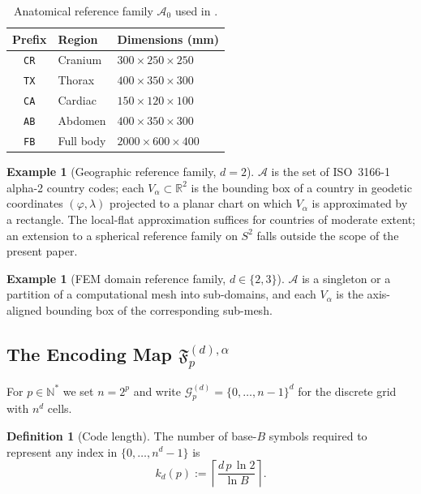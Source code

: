 \documentclass[11pt,a4paper]{article}
\theoremstyle{plain}
\theoremstyle{definition}
\newtheorem{definition}[theorem]{Definition}
\newtheorem{example}[theorem]{Example}
\theoremstyle{remark}
\newcommand{\N}{\mathbb{N}}
\newcommand{\R}{\mathbb{R}}
\newcommand{\Fc}{\mathfrak{F}}
\newcommand{\Grid}{\mathcal{G}}
\begin{document}
\begin{table}[!htbp]
\centering
\small
\begin{tabular}{cll}
\toprule
Prefix & Region & Dimensions (mm) \\
\midrule
\texttt{CR} & Cranium & $300 \times 250 \times 250$ \\
\texttt{TX} & Thorax & $400 \times 350 \times 300$ \\
\texttt{CA} & Cardiac & $150 \times 120 \times 100$ \\
\texttt{AB} & Abdomen & $400 \times 350 \times 300$ \\
\texttt{FB} & Full body & $2000 \times 600 \times 400$ \\
\bottomrule
\end{tabular}
\caption{Anatomical reference family $\mathcal{A}_0$ used in
.}
\label{tab:reference_volumes}
\end{table}

\begin{example}[Geographic reference family, $d=2$]\label{ex:geographic}
$\mathcal{A}$ is the set of ISO~3166-1 alpha-2 country codes; each
$V_\alpha\subset\R^2$ is the bounding box of a country in geodetic
coordinates $(\varphi,\lambda)$ projected to a planar chart on which
$V_\alpha$ is approximated by a rectangle. The local-flat
approximation suffices for countries of moderate extent; an extension
to a spherical reference family on $S^2$ falls outside the scope of
the present paper.
\end{example}

\begin{example}[FEM domain reference family, $d\in\{2,3\}$]
\label{ex:fem}
$\mathcal{A}$ is a singleton or a partition of a computational mesh into
sub-domains, and each $V_\alpha$ is the axis-aligned bounding box of the
corresponding sub-mesh.
\end{example}

\subsection{The Encoding Map \texorpdfstring{$\Fc_p^{(d),\alpha}$}{F}}
\label{sec:framework_encoding}

For $p\in\N^*$ we set $n=2^p$ and write
$\Grid_p^{(d)} = \{0,\dots,n-1\}^d$ for the discrete grid with $n^d$ cells.

\begin{definition}[Code length]\label{def:codelen}
The number of base-$B$ symbols required to represent any index in
$\{0,\dots,n^d-1\}$ is
\[
k_d(p) := \left\lceil \dfrac{d\,p\,\ln 2}{\ln B} \right\rceil.
\]
\end{definition}
\end{document}
